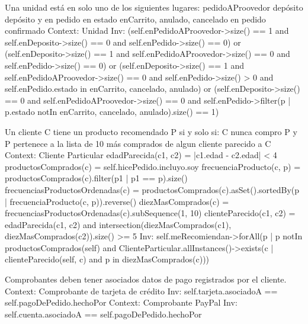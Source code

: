 \begin{listocl}
  \begin{itemocl}{
      Una unidad está en solo uno de los siguientes lugares:
          pedidoAProovedor
          depósito
          depósito y en pedido en estado enCarrito, anulado, cancelado
          en pedido confirmado
    }
Context: Unidad
Inv:
(self.enPedidoAProovedor->size() == 1 and self.enDeposito->size() == 0 and self.enPedido->size() == 0)
or
(self.enDeposito->size() == 1 and self.enPedidoAProovedor->size() == 0 and self.enPedido->size() == 0)
or
(self.enDeposito->size() == 1 and self.enPedidoAProovedor->size() == 0 and self.enPedido->size() > 0 and self.enPedido.estado in {enCarrito, cancelado, anulado})
or
(self.enDeposito->size() == 0 and self.enPedidoAProovedor->size() == 0 and self.enPedido->filter(p | p.estado notIn {enCarrito, cancelado, anulado}).size() == 1)
  \end{itemocl}

  \begin{itemocl}{
      Un cliente C tiene un producto recomendado P si y solo si:
          C nunca compro P y
          P pertenece a la lista de 10 más comprados de algun cliente parecido a C
    }
Context: Cliente Particular
edadParecida(c1, c2) = |c1.edad - c2.edad| < 4
productosComprados(c) = self.hicePedido.incluyo.soy
frecuenciaProducto(c, p) = productosComprados(c).filter(p1 | p1 == p).size()
frecuenciasProductosOrdenadas(c) = productosComprados(c).asSet().sortedBy(p | frecuenciaProducto(c, p)).reverse()
diezMasComprados(c) = frecuenciasProductosOrdenadas(c).subSequence(1, 10)
clienteParecido(c1, c2) = edadParecida(c1, c2) and intersection(diezMasComprados(c1), diezMasComprados(c2)).size() >= 5
Inv: self.meRecomiendan->forAll(p | p notIn productosComprados(self) and ClienteParticular.allInstances()->exists(c | clienteParecido(self, c) and p in diezMasComprados(c)))
  \end{itemocl}

  \begin{itemocl}{Comprobantes deben tener asociados datos de pago registrados por el cliente.}
Context: Comprobante de tarjeta de cr\'edito
Inv: self.tarjeta.asociadoA == self.pagoDePedido.hechoPor
Context: Comprobante PayPal
Inv: self.cuenta.asociadoA == self.pagoDePedido.hechoPor
  \end{itemocl}
\end{listocl}
